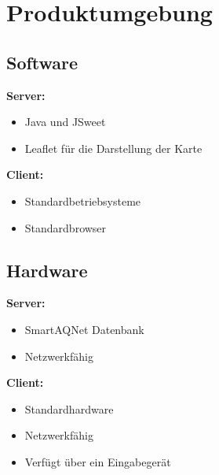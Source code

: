 \section{Produktumgebung}
\subsection{Software}
\textbf{Server:}
\begin{itemize} [noitemsep]
    \item Java und JSweet
    \item Leaflet für die Darstellung der Karte
\end{itemize}
\textbf{ Client:}
\begin{itemize} [noitemsep]
    \item Standardbetriebsysteme
    \item Standardbrowser
\end{itemize}
\subsection{Hardware}
\textbf{Server:}
\begin{itemize} [noitemsep]
    \item SmartAQNet Datenbank
    \item Netzwerkfähig 
\end{itemize}
\textbf{Client:}
\begin{itemize} [noitemsep]
    \item Standardhardware
    \item Netzwerkfähig 
    \item Verfügt über ein Eingabegerät
\end{itemize}